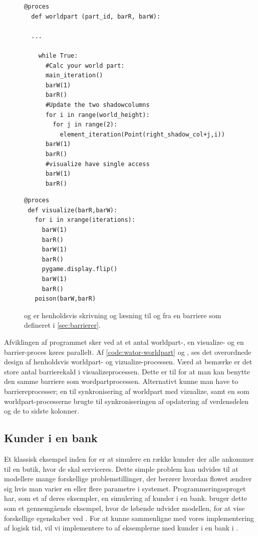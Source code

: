 \begin{figure}[hbtp]
\begin{minipage}{\linewidth}
\begin{lstlisting}[label=code:wator-worldpart,caption=Uddrag af processen 
  \code{worldpart} i Wator]
  @proces
  def worldpart (part_id, barR, barW):
  
  ...
  
    while True:
      #Calc your world part:
      main_iteration()
      barW(1)
      barR()
      #Update the two shadowcolumns
      for i in range(world_height):
        for j in range(2):
          element_iteration(Point(right_shadow_col+j,i))
      barW(1)
      barR()
      #visualize have single access
      barW(1)
      barR()
\end{lstlisting}

\begin{lstlisting}[label=code:wator-visualize,caption=Processen 
  \emph{visualize} i Wator]
@proces
 def visualize(barR,barW):
   for i in xrange(iterations):
     barW(1)
     barR()
     barW(1)
     barR()
     pygame.display.flip()
     barW(1)
     barR()
   poison(barW,barR)
\end{lstlisting}

\end{minipage}
\caption[test]{ og  er henholdsvis skrivning og læsning til og 
fra en barriere som defineret i \cref{sec:barrierer}.}
\end{figure}
Afviklingen af programmet sker ved at et antal worldpart-, en 
visualize- og en barrier-proces køres parallelt. Af 
\autoref{code:wator-worldpart} og \pageref{code:wator-visualize}, ses det 
overordnede design af henholdsvis worldpart- og 
vizualize-processen.  Værd at bemærke er det store antal barrierekald i 
visualizeprocessen. Dette er til for at man kan benytte den samme barriere som 
wordpartprocessen. Alternativt kunne man have to barriereprocesser; en til 
synkronisering af worldpart med vizualize, samt en som 
worldpart-processerne brugte til synkroniseringen af opdatering af 
verdensdelen og de to sidste kolonner. 



\subsection{Kunder i en bank}\label{bank-eksempel}
Et klassisk eksempel inden for \des er at simulere  en række kunder der alle 
ankommer til en butik, hvor de skal serviceres. Dette simple problem kan 
udvides til at modellere mange forskellige problemstillinger, der berører 
hvordan flowet ændrer sig hvis man varier en eller flere parametre
i systemet. Programmeringssproget \simpy{}har, som et af deres 
eksempler, en simulering af kunder i en bank. \simpy bruger dette som et 
gennemgående eksempel, hvor de løbende udvider modellen, for at vise 
forskellige egenskaber ved \simpy. For at kunne sammenligne \simpy  med vores 
implementering af logisk tid, vil vi implementere to af eksemplerne med kunder 
i en bank i \pycsp.

